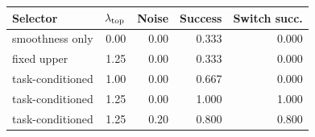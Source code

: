 \begin{tabular}{lrrrr}
\toprule
Selector & $\lambda_{\rm top}$ & Noise & Success & Switch succ. \\
\midrule
smoothness only & 0.00 & 0.00 & 0.333 & 0.000 \\
fixed upper & 1.25 & 0.00 & 0.333 & 0.000 \\
task-conditioned & 1.00 & 0.00 & 0.667 & 0.000 \\
task-conditioned & 1.25 & 0.00 & 1.000 & 1.000 \\
task-conditioned & 1.25 & 0.20 & 0.800 & 0.800 \\
\bottomrule
\end{tabular}
